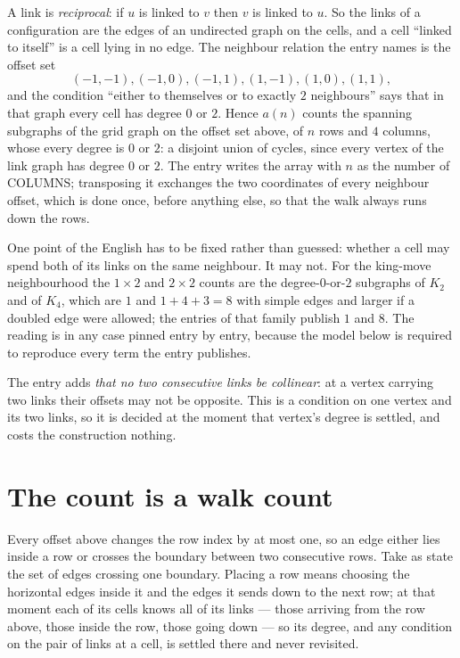 \documentclass[11pt,a4paper]{article}
\theoremstyle{plain}
\theoremstyle{definition}
\begin{document}
A link is \emph{reciprocal}: if $u$ is linked to $v$ then $v$ is linked to $u$. So the links
of a configuration are the edges of an undirected graph on the cells, and a cell ``linked to
itself'' is a cell lying in no edge. The neighbour relation the entry names is the offset set
\[
(-1,-1), (-1,0), (-1,1), (1,-1), (1,0), (1,1),
\]
and the condition ``either to themselves or to exactly $2$ neighbours'' says that in that
graph every cell has degree $0$ or $2$. Hence $a(n)$ counts the spanning subgraphs of the
grid graph on the offset set above, of $n$ rows and $4$ columns,
whose every degree is $0$ or $2$: a disjoint union of cycles, since every vertex of the link graph has degree $0$ or $2$. The entry writes the array with $n$ as the number of COLUMNS; transposing it exchanges the two coordinates of every neighbour offset, which is done once, before anything else, so that the walk always runs down the rows.

One point of the English has to be fixed rather than guessed: whether a cell may spend both of
its links on the same neighbour. It may not. For the king-move neighbourhood the $1\times2$
and $2\times2$ counts are the degree-$0$-or-$2$ subgraphs of $K_2$ and of $K_4$, which are $1$
and $1+4+3=8$ with simple edges and larger if a doubled edge were allowed; the entries of that
family publish $1$ and $8$. The reading is in any case pinned entry by entry, because the
model below is required to reproduce every term the entry publishes.

The entry adds \emph{that no two consecutive links be collinear}: at a vertex carrying two
links their offsets may not be opposite. This is a condition on one vertex and its two links,
so it is decided at the moment that vertex's degree is settled, and costs the construction
nothing.

\section{The count is a walk count}

Every offset above changes the row index by at most one, so an edge either lies inside a row
or crosses the boundary between two consecutive rows. Take as state the set of edges crossing
one boundary. Placing a row means choosing the horizontal edges inside it and the edges it
sends down to the next row; at that moment each of its cells knows all of its links --- those
arriving from the row above, those inside the row, those going down --- so its degree, and any
condition on the pair of links at a cell, is settled there and never revisited.
\end{document}
